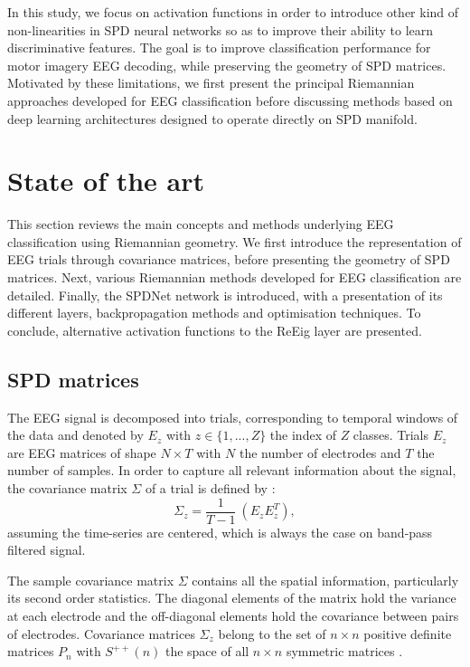 \documentclass[11pt,a4paper]{article}
\begin{document}
In this study, we focus on activation functions in order to introduce other kind of non-linearities in SPD neural networks so as to improve their ability to learn discriminative features. The goal is to improve classification performance for motor imagery EEG decoding, while preserving the geometry of SPD matrices.
Motivated by these limitations, we first present the principal Riemannian approaches developed for EEG classification before discussing methods based on deep learning architectures designed to operate directly on SPD manifold.


\newpage

\section{State of the art } 
This section reviews the main concepts and methods underlying EEG classification using Riemannian geometry. We first introduce the representation of EEG trials through covariance matrices, before presenting the geometry of SPD matrices. Next, various Riemannian methods developed for EEG classification are detailed. Finally, the SPDNet network is introduced, with a presentation of its different layers, backpropagation methods and optimisation techniques. To conclude, alternative activation functions to the ReEig layer are presented.


\subsection{SPD matrices}
\label{sec:SPDmatrices}
The EEG signal is decomposed into trials, corresponding to temporal windows of the data and denoted by $E_z$ with $z \in \{1, ..., Z\}$ the index of $Z$ classes. Trials $E_z$ are EEG matrices of shape $N \times T$ with $N$ the number of electrodes and $T$ the number of samples. In order to capture all relevant information about the signal, the covariance matrix $\Sigma$ of a trial is defined by :  \[ \Sigma_z = \frac{1}{T-1}\ (E_z E_z^T), \]  \cite{marco2017}
assuming the time-series are centered, which is always the case on band-pass filtered signal.

\noindent The sample covariance matrix $\Sigma$ contains all the spatial information, particularly its second order statistics. The diagonal elements of the matrix hold the variance at each electrode and the off-diagonal elements hold the covariance between pairs of electrodes. 
Covariance matrices $\Sigma_z$ belong to the set of $n \times n$ positive definite matrices $P_n $ with $S^{++}(n)$ the space of all $n \times n$ symmetric matrices \cite{barachant2012}. \\ 
\end{document}

